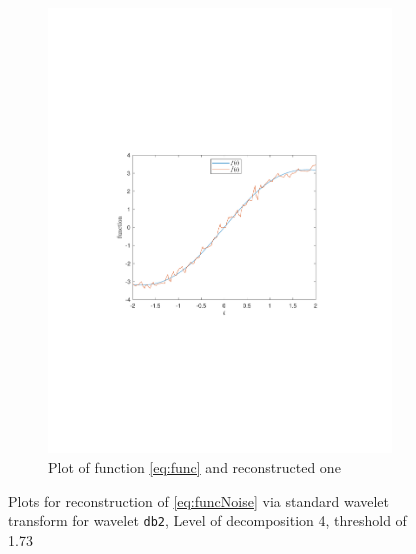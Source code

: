 \documentclass[a4paper]{article}
\begin{document}
\begin{figure}[H]
\begin{subfigure}{0.49\textwidth}
		\includegraphics[trim={3.5cm 8cm 4cm 8cm},clip,width=1\textwidth]{Images/FuncRecStd.pdf}
		\caption{Plot of function \cref{eq:func} and reconstructed one}
		\label{sub:FuncRecStd}
	\end{subfigure}
	\caption{Plots for reconstruction of \cref{eq:funcNoise} via standard wavelet transform for wavelet \texttt{db2}, Level of decomposition 4, threshold of 1.73}
	\label{fig:FuncRecStd}
\end{figure}
\end{document}

